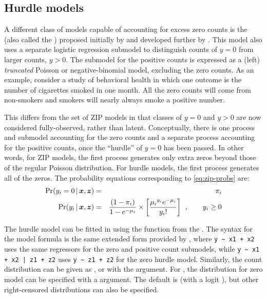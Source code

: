 \documentclass[11pt]{book}\usepackage[]{graphicx}\usepackage[]{color}
\begin{document}
\subsection{Hurdle models}\label{sec:glm-hurdle}
A different class of models capable of accounting for excess zero counts is the
 (also called the )
proposed initially by \citet{Cragg:1971} and developed further by
\citet{Mullahy:1986}.
This model also uses a separate logistic regression submodel to distinguish
counts of $y=0$ from larger counts, $y>0$.
The submodel for the positive counts is expressed as a (left) \emph{truncated}
Poisson or negative-binomial model, excluding the zero counts.
As an example, consider a study of behavioral health in which one outcome is
the number of cigarettes smoked in one month.  All the zero counts will come from
non-smokers and smokers will nearly always smoke a positive number.

This differs from the set of ZIP models in that classes of $y=0$ and $y>0$
are now considered fully-observed, rather than latent.
Conceptually, there is one process and submodel accounting for the zero counts
and a separate process accounting for the positive counts, once the ``hurdle''
of $y=0$ has been passed.
In other words, for ZIP models, the first process generates
only extra zeros beyond those of the regular Poisson distribution.
For hurdle models, the first process generates all of the zeros.
The probability equations corresponding to \eqref{eq:zip-probs} are:
\begin{eqnarray}
\Pr ({y_i} = 0 \, | \, \bm{x}, \bm{z}) &=& {\pi _i} \\
\Pr ({y_i} \, | \, \bm{x}, \bm{z}) &=& \frac{(1 - {\pi _i})}{1-e^{-\mu_i}}
\times \left[\frac{{{\mu _i}^{{y_i}}{e^{ - {\mu _i}}}}}{{{y_i}!}} \right] \:\: , \quad\quad y_i \ge 0 \nonumber
\end{eqnarray}

The hurdle model can be fitted in \R using the  function from the .
The syntax for the model formula is the same extended form provided by ,
where \verb|y ~ x1 + x2| uses the same regressors for the zero and positive count submodels,
while \verb#y ~ x1 + x2 | z1 + z2# uses \verb|y ~ z1 + z2| for the zero hurdle model.
Similarly, the count distribution can be given
as
,  or 
with the  argument.  For , the distribution for zero model
can be specified with a  argument. The default is 
(with a logit ), but other right-censored
distributions can also be specified.
\end{document}
